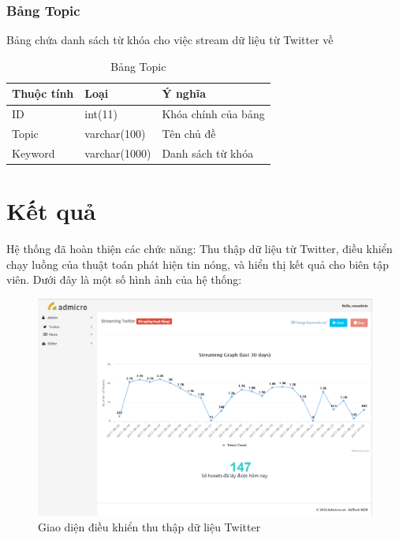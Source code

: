 		\subsubsection{Bảng Topic}
		Bảng chứa danh sách từ khóa cho việc stream dữ liệu từ Twitter về
			\begin{table}[H]
				\centering
				\setlength\extrarowheight{3pt}
				\begin{tabular}{|l|l|l|}
					\hline
					\textbf{Thuộc tính}     & \textbf{Loại} & \textbf{Ý nghĩa} \\\hline
					ID      	& int(11)       &  Khóa chính của bảng\\\hline
					Topic	& varchar(100)      &  Tên chủ đề\\\hline
					Keyword	& varchar(1000)    	&  Danh sách từ khóa\\\hline
				\end{tabular}
				\caption{Bảng Topic}
				\label{tab:topic}
			\end{table}
\section{Kết quả}
Hệ thống đã hoàn thiện các chức năng: Thu thập dữ liệu từ Twitter, điều khiển chạy luồng của thuật toán phát hiện tin nóng, và hiển thị kết quả cho biên tập viên. Dưới đây là một số hình ảnh của hệ thống:

\begin{figure}[H]
	\centering
	\includegraphics[width=1\linewidth]{Chapter3/Chapter3Figs/StreamingNonwide}
	\caption{Giao diện điều khiển thu thập dữ liệu Twitter}
	\label{fig:streaming}
\end{figure}

